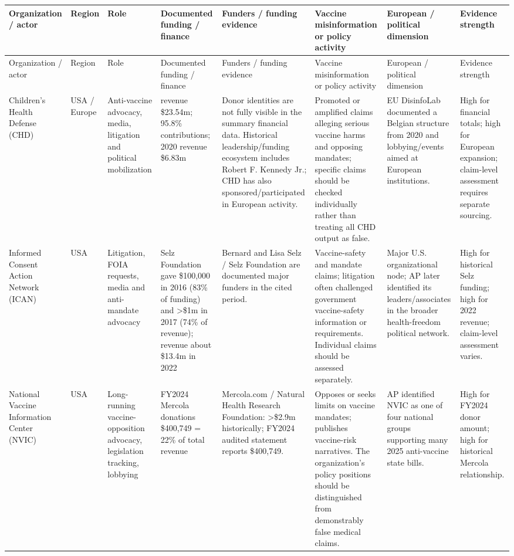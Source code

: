 \documentclass[11pt]{article}
\begin{document}
\begin{landscape}
\small
\begin{longtable}{>{\raggedright\arraybackslash}p{2.1cm}
>{\raggedright\arraybackslash}p{1.4cm}
>{\raggedright\arraybackslash}p{3.0cm}
>{\raggedright\arraybackslash}p{3.3cm}
>{\raggedright\arraybackslash}p{3.0cm}
>{\raggedright\arraybackslash}p{3.2cm}
>{\raggedright\arraybackslash}p{3.0cm}
>{\raggedright\arraybackslash}p{2.0cm}}
\toprule
Organization / actor & Region & Role & Documented funding / finance & Funders / funding evidence & Vaccine misinformation or policy activity & European / political dimension & Evidence strength\\
\midrule
\endfirsthead
\toprule
Organization / actor & Region & Role & Documented funding / finance & Funders / funding evidence & Vaccine misinformation or policy activity & European / political dimension & Evidence strength\\
\midrule
\endhead
Children's Health Defense (CHD) & USA / Europe & Anti-vaccine advocacy, media, litigation and political mobilization & 2022 revenue \$23.54m; 95.8\% contributions; 2020 revenue \$6.83m & Donor identities are not fully visible in the summary financial data. Historical leadership/funding ecosystem includes Robert F. Kennedy Jr.; CHD has also sponsored/participated in European activity. & Promoted or amplified claims alleging serious vaccine harms and opposing mandates; specific claims should be checked individually rather than treating all CHD output as false. & EU DisinfoLab documented a Belgian structure from 2020 and lobbying/events aimed at European institutions. & High for financial totals; high for European expansion; claim-level assessment requires separate sourcing. \\
Informed Consent Action Network (ICAN) & USA & Litigation, FOIA requests, media and anti-mandate advocacy & Selz Foundation gave \$100,000 in 2016 (83\% of funding) and >\$1m in 2017 (74\% of revenue); revenue about \$13.4m in 2022 & Bernard and Lisa Selz / Selz Foundation are documented major funders in the cited period. & Vaccine-safety and mandate claims; litigation often challenged government vaccine-safety information or requirements. Individual claims should be assessed separately. & Major U.S. organizational node; AP later identified its leaders/associates in the broader health-freedom political network. & High for historical Selz funding; high for 2022 revenue; claim-level assessment varies. \\
National Vaccine Information Center (NVIC) & USA & Long-running vaccine-opposition advocacy, legislation tracking, lobbying & FY2024 Mercola donations \$400,749 = 22\% of total revenue & Mercola.com / Natural Health Research Foundation: >\$2.9m historically; FY2024 audited statement reports \$400,749. & Opposes or seeks limits on vaccine mandates; publishes vaccine-risk narratives. The organization's policy positions should be distinguished from demonstrably false medical claims. & AP identified NVIC as one of four national groups supporting many 2025 anti-vaccine state bills. & High for FY2024 donor amount; high for historical Mercola relationship. \\

\end{longtable}
\end{landscape}
\end{document}
